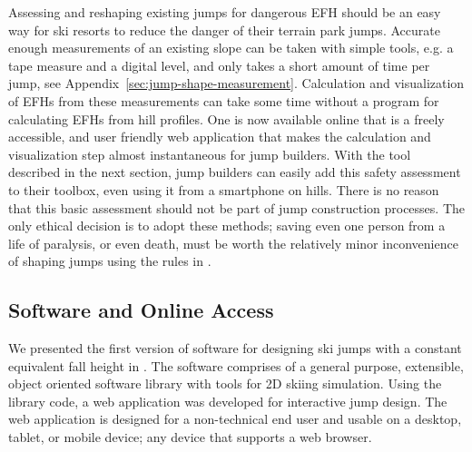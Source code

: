 \documentclass[smallextended]{svjour3}       %
\begin{document}
Assessing and reshaping existing jumps for dangerous EFH should be an easy way
for ski resorts to reduce the danger of their terrain park jumps. Accurate
enough measurements of an existing slope can be taken with simple tools, e.g. a
tape measure and a digital level, and only takes a short amount of time per
jump, see Appendix~\ref{sec:jump-shape-measurement}.  Calculation and
visualization of EFHs  from these measurements can take some time without a
program for calculating EFHs from hill profiles. One is now available online
that is a freely accessible, and user friendly web application that makes the
calculation and visualization step almost instantaneous for jump builders. With
the tool described in the next section, jump builders can easily add this
safety assessment to their toolbox, even using it from a smartphone on hills.
There is no reason that this basic assessment should not be part of jump
construction processes. The only ethical decision is to adopt these methods;
saving even one person from a life of paralysis, or even death, must be worth
the relatively minor inconvenience of shaping jumps using the rules in
\cite{Levy2015}.


\subsection{Software and Online Access}
\label{sec:software}
%
We presented the first version of software for designing ski jumps with a
constant equivalent fall height in \cite{Moore2018}. The software comprises of
a general purpose, extensible, object oriented software library with tools for
2D skiing simulation. Using the library code, a web application was developed
for interactive jump design. The web application is designed for a
non-technical end user and usable on a desktop, tablet, or mobile device; any
device that supports a web browser.
\end{document}
